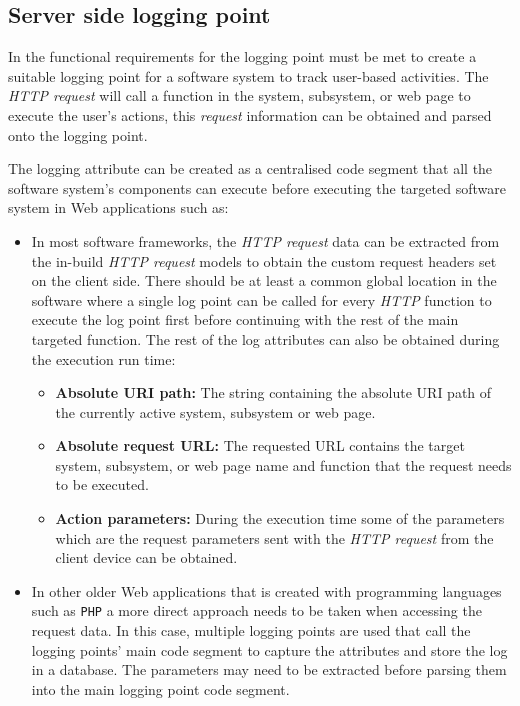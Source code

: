 \subsection{Server side logging point}\label{sec:ch2_serverSideLoggingpoint}
In  the functional requirements for the logging point must be met to create a suitable logging point for a software system to track user-based activities. The \textit{HTTP request} will call a function in the system, subsystem, or web page to execute the user's actions, this \textit{request} information can be obtained and parsed onto the logging point.\par The logging attribute can be created as a centralised code segment that all the software system's components can execute before executing the targeted software system in Web applications such as:

\begin{itemize}
	\item In most software frameworks, the \textit{HTTP request} data can be extracted from the in-build \textit{HTTP request} models to obtain the custom request headers set on the client side. There should be at least a common global location in the software where a single log point can be called for every \textit{HTTP} function to execute the log point first before continuing with the rest of the main targeted function. The rest of the log attributes can also be obtained during the execution run time:
	\begin{itemize}
		\item \textbf{Absolute URI path:} The string containing the absolute URI path of the currently active system, subsystem or web page. 
		\item \textbf{Absolute request URL:} The requested URL contains the target system, subsystem, or web page name and function that the request needs to be executed. 
		\item \textbf{Action parameters:} During the execution time some of the parameters which are the request parameters sent with the \textit{HTTP request} from the client device can be obtained.
	\end{itemize}
	\item In other older Web applications that is created with programming languages such as \texttt{PHP} a more direct approach needs to be taken when accessing the request data. In this case, multiple logging points are used that call the logging points' main code segment to capture the attributes and store the log in a database. The parameters may need to be extracted before parsing them into the main logging point code segment.
\end{itemize}

